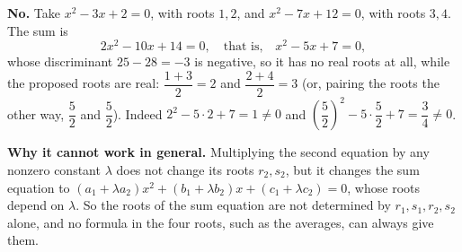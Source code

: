 \textbf{No.} Take $x^2-3x+2=0$, with roots $1,2$, and $x^2-7x+12=0$, with roots $3,4$. The sum is
\[2x^2-10x+14=0,\quad\text{that is,}\quad x^2-5x+7=0,\]
whose discriminant $25-28=-3$ is negative, so it has no real roots at all, while the proposed roots are real: $\dfrac{1+3}{2}=2$ and $\dfrac{2+4}{2}=3$ (or, pairing the roots the other way, $\dfrac{5}{2}$ and $\dfrac{5}{2}$). Indeed $2^2-5\cdot2+7=1\ne0$ and $\left(\dfrac{5}{2}\right)^2-5\cdot\dfrac{5}{2}+7=\dfrac{3}{4}\ne0$.

\textbf{Why it cannot work in general.} Multiplying the second equation by any nonzero constant $\lambda$ does not change its roots $r_2,s_2$, but it changes the sum equation to $(a_1+\lambda a_2)x^2+(b_1+\lambda b_2)x+(c_1+\lambda c_2)=0$, whose roots depend on $\lambda$. So the roots of the sum equation are not determined by $r_1,s_1,r_2,s_2$ alone, and no formula in the four roots, such as the averages, can always give them.

